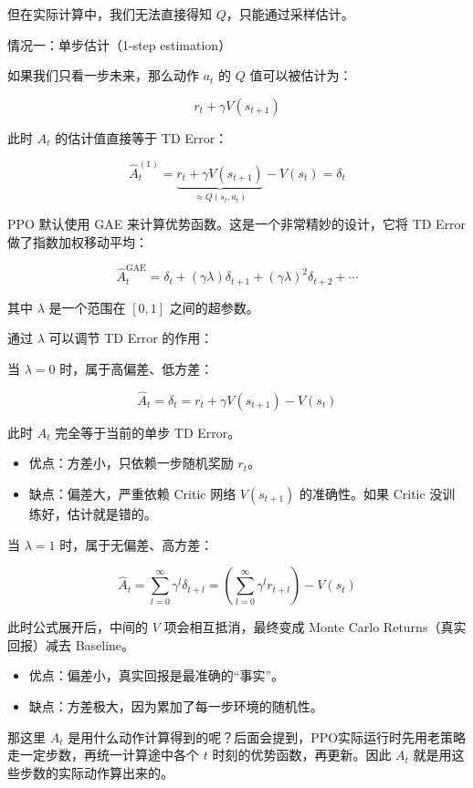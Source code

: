 但在实际计算中，我们无法直接得知 \(Q\)，只能通过采样估计。

情况一：单步估计（1-step estimation）

如果我们只看一步未来，那么动作 \(a_t\) 的 \(Q\) 值可以被估计为：

\[
r_t+\gamma V(s_{t+1})
\]

此时 \(A_t\) 的估计值直接等于 TD Error：

\[
\hat{A}_t^{(1)}=\underbrace{r_t+\gamma V(s_{t+1})}_{\approx Q(s_t,a_t)}-V(s_t)=\delta_t
\]

PPO 默认使用 GAE 来计算优势函数。这是一个非常精妙的设计，它将 TD Error 做了指数加权移动平均：

\[
\hat{A}_t^{\mathrm{GAE}}
=
\delta_t+(\gamma\lambda)\delta_{t+1}+(\gamma\lambda)^{2}\delta_{t+2}+\cdots
\]

其中 \(\lambda\) 是一个范围在 \([0,1]\) 之间的超参数。

通过 \(\lambda\) 可以调节 TD Error 的作用：

当 \(\lambda=0\) 时，属于高偏差、低方差：

\[
\hat{A}_t=\delta_t=r_t+\gamma V(s_{t+1})-V(s_t)
\]

此时 \(A_t\) 完全等于当前的单步 TD Error。

\begin{itemize}
\tightlist
\item
  优点：方差小，只依赖一步随机奖励 \(r_t\)。
\item
  缺点：偏差大，严重依赖 Critic 网络 \(V(s_{t+1})\) 的准确性。如果 Critic 没训练好，估计就是错的。
\end{itemize}

当 \(\lambda=1\) 时，属于无偏差、高方差：

\[
\hat{A}_t=\sum_{l=0}^{\infty}\gamma^{l}\delta_{t+l}=\left(\sum_{l=0}^{\infty}\gamma^{l}r_{t+l}\right)-V(s_t)
\]

此时公式展开后，中间的 \(V\) 项会相互抵消，最终变成 Monte Carlo Returns（真实回报）减去 Baseline。

\begin{itemize}
\tightlist
\item
  优点：偏差小，真实回报是最准确的``事实''。
\item
  缺点：方差极大，因为累加了每一步环境的随机性。
\end{itemize}

那这里 \(A_t\) 是用什么动作计算得到的呢？后面会提到，PPO实际运行时先用老策略走一定步数，再统一计算途中各个 \(t\) 时刻的优势函数，再更新。因此 \(A_t\) 就是用这些步数的实际动作算出来的。

